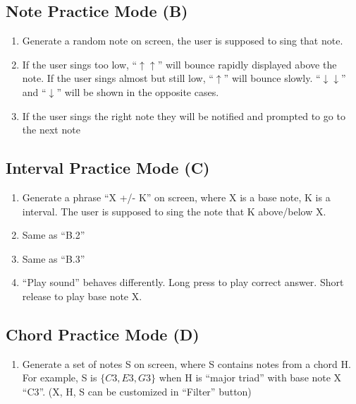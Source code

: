 \documentclass{article}
\begin{document}
\subsection{Note Practice Mode (B)}
\begin{enumerate}
  \item Generate a random note on screen, the user is supposed to sing that note. 
  \item If the user sings too low, “$\uparrow\uparrow$” will bounce rapidly displayed above the note. If the user sings almost but still low, “$\uparrow$” will bounce slowly. “$\downarrow\downarrow$” and “$\downarrow$” will be shown in the opposite cases.
  \item If the user sings the right note they will be notified and prompted to go to the next note  

\end{enumerate}

\subsection{Interval Practice Mode (C)}
\begin{enumerate}
  \item Generate a phrase “X +/- K” on screen, where X is a base note, K is a interval. The user is supposed to sing the note that K above/below X.
  \item Same as “B.2”
  \item Same as “B.3”
  \item “Play sound” behaves differently. Long press to play correct answer. Short release to play base note X.

\end{enumerate}

\subsection{Chord Practice Mode (D) }
\begin{enumerate}
  \item Generate a set of notes S on screen, where S contains notes from a chord H. For example, S is $\{C3, E3, G3\}$ when H is “major triad” with base note X “C3”.  (X,  H, S can be customized in “Filter” button)
\end{enumerate}
\end{document}

